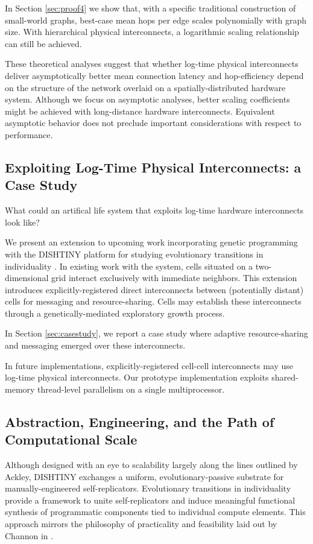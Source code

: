 In Section \ref{sec:proof4} we show that, with a specific traditional construction of small-world graphs, best-case mean hops per edge scales polynomially with graph size.
With hierarchical physical interconnects, a logarithmic scaling relationship can still be achieved.

These theoretical analyses suggest that whether log-time physical interconnects deliver asymptotically better mean connection latency and hop-efficiency depend on the structure of the network overlaid on a spatially-distributed hardware system.
Although we focus on asymptotic analyses, better scaling coefficients might be achieved with long-distance hardware interconnects.
Equivalent asymptotic behavior does not preclude important considerations with respect to performance.

\subsection{Exploiting Log-Time Physical Interconnects: a Case Study}

What could an artifical life system that exploits log-time hardware interconnects look like?

We present an extension to upcoming work incorporating genetic programming with the DISHTINY platform for studying evolutionary transitions in individuality \citep{moreno2019toward}.
In existing work with the system, cells situated on a two-dimensional grid interact exclusively with immediate neighbors.
This extension introduces explicitly-registered direct interconnects between (potentially distant) cells for messaging and resource-sharing.
Cells may establish these interconnects through a genetically-mediated exploratory growth process.

In Section \ref{sec:casestudy}, we report a case study where adaptive resource-sharing and messaging emerged over these interconnects.

In future implementations, explicitly-registered cell-cell interconnects may  use log-time physical interconnects.
Our prototype implementation exploits shared-memory thread-level parallelism on a single multiprocessor.

\subsection{Abstraction, Engineering, and the Path of Computational Scale}

Although designed with an eye to scalability largely along the lines outlined by Ackley, DISHTINY exchanges a uniform, evolutionary-passive substrate for manually-engineered self-replicators.
Evolutionary transitions in individuality provide a framework to unite self-replicators and induce meaningful functional synthesis of programmatic components tied to individual compute elements.
This approach mirrors the philosophy of practicality and feasibility laid out by Channon in \citep{channon2019maximum}.

